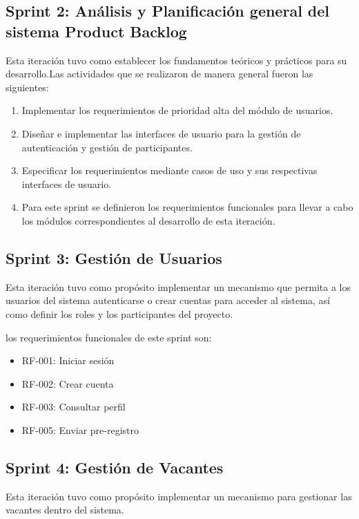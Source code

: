 \subsection{Sprint 2: Análisis y Planificación general del sistema Product Backlog}
Esta iteración tuvo como establecer los fundamentos teóricos y prácticos para su desarrollo.Las actividades que se realizaron 
de manera general fueron las siguientes:
\begin{enumerate}
    \item Implementar los requerimientos de prioridad alta del módulo de usuarios.
    \item Diseñar e implementar las interfaces de usuario para la gestión de autenticación y gestión de
    participantes.
    \item Especificar los requerimientos mediante casos de uso y sus respectivas interfaces de usuario.
    \item Para este sprint se definieron los requerimientos funcionales para llevar a cabo los módulos
    correspondientes al desarrollo de esta iteración.
\end{enumerate} 

\subsection{Sprint 3: Gestión de Usuarios}
Esta iteración tuvo como propósito implementar un mecanismo que permita a
los usuarios del sistema autenticarse o crear cuentas para acceder al sistema, así como definir los
roles y los participantes del proyecto.


los requerimientos funcionales de este sprint son:

\begin{itemize}
    \item RF-001: Iniciar sesión
    \item RF-002: Crear cuenta
    \item RF-003: Consultar perfil
    \item RF-005: Enviar pre-registro
\end{itemize}



\subsection{Sprint 4: Gestión de Vacantes}

Esta iteración tuvo como propósito implementar un mecanismo para gestionar las vacantes dentro del sistema.


